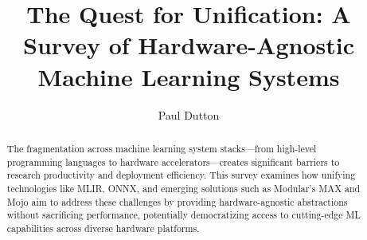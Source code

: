 \documentclass[manuscript,screen,review,format=acmsmall]{acmart}
\begin{document}
\title{The Quest for Unification: A Survey of Hardware-Agnostic Machine Learning Systems}

\author{Paul Dutton}


\renewcommand{\shortauthors}{Dutton et al.}

\begin{abstract}
The fragmentation across machine learning system stacks—from high-level programming languages to hardware accelerators—creates significant barriers to research productivity and deployment efficiency. This survey examines how unifying technologies like MLIR, ONNX, and emerging solutions such as Modular's MAX and Mojo aim to address these challenges by providing hardware-agnostic abstractions without sacrificing performance, potentially democratizing access to cutting-edge ML capabilities across diverse hardware platforms.
\end{abstract}
\end{document}
